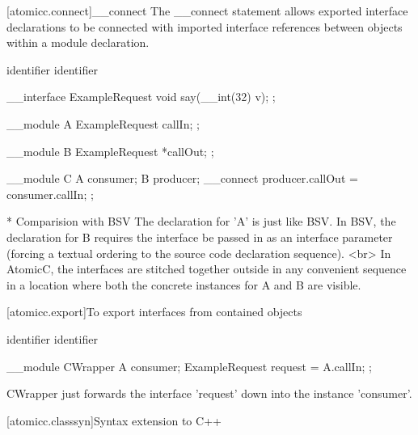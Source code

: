 [atomicc.connect]{__connect}
The __connect statement allows exported interface declarations to be connected
with imported interface references between objects within a module declaration.

\begin{bnf}
\br
     identifier \terminal{=} identifier \terminal{;}
\end{bnf}

\begin{example}
\begin{codeblock}
     __interface ExampleRequest {
         void say(__int(32) v);
     };

     __module A {
          ExampleRequest callIn;
     };

     __module B {
         ExampleRequest *callOut;
     };

     __module C {
         A consumer;
         B producer;
         __connect producer.callOut = consumer.callIn;
     };
\end{codeblock}
\end{example}

* Comparision with BSV
    The declaration for 'A' is just like BSV.
    In BSV, the declaration for B requires the interface be passed in as
    an interface parameter (forcing a textual ordering to the source code
    declaration sequence).
    <br>
    In AtomicC, the interfaces are stitched together outside in any
    convenient sequence in a location where both the concrete instances
    for A and B are visible.

[atomicc.export]{To export interfaces from contained objects}

\begin{bnf}
\br
     identifier \terminal{=} identifier \terminal{;}
\end{bnf}

\begin{example}
\begin{codeblock}
     __module CWrapper {
         A consumer;
         ExampleRequest request = A.callIn;
      };
\end{codeblock}
\end{example}

CWrapper just forwards the interface 'request' down into the instance 'consumer'.

[atomicc.classsyn]{Syntax extension to C++}
\begin{bnf}
\br
     \br
     \br
\end{bnf}
